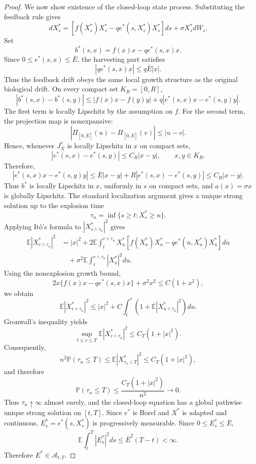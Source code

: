 \documentclass[11pt]{article}
\begin{document}
\begin{proof}
		We now show existence of the closed-loop state process. Substituting the feedback rule gives
		\[
		dX_s^*
		=
		\left[
		f(X_s^*)X_s^*
		-
		qe^*(s,X_s^*)X_s^*
		\right]ds
		+
		\sigma X_s^*dW_s.
		\]
		Set
		\[
		b^*(s,x)
		=
		f(x)x-qe^*(s,x)x.
		\]
		Since $0\le e^*(s,x)\le\bar E$, the harvesting part satisfies
		\[
		|qe^*(s,x)x|
		\le q\bar E |x|.
		\]
		Thus the feedback drift obeys the same local growth structure as the original biological drift. On every compact set $K_R=[0,R]$,
		\[
		|b^*(s,x)-b^*(s,y)|
		\le
		|f(x)x-f(y)y|
		+
		q|e^*(s,x)x-e^*(s,y)y|.
		\]
		The first term is locally Lipschitz by the assumption on $f$. For the second term, the projection map is nonexpansive:
		\[
		|\Pi_{[0,\bar E]}(u)-\Pi_{[0,\bar E]}(v)|
		\le |u-v|.
		\]
		Hence, whenever $J_X^*$ is locally Lipschitz in $x$ on compact sets,
		\[
		|e^*(s,x)-e^*(s,y)|
		\le
		C_R|x-y|,
		\qquad x,y\in K_R.
		\]
		Therefore,
		\[
		|e^*(s,x)x-e^*(s,y)y|
		\le
		\bar E|x-y|+R|e^*(s,x)-e^*(s,y)|
		\le
		C_R|x-y|.
		\]
		Thus $b^*$ is locally Lipschitz in $x$, uniformly in $s$ on compact sets, and $a(x)=\sigma x$ is globally Lipschitz. The standard localization argument gives a unique strong solution up to the explosion time
		\[
		\tau_n=\inf\{s\ge t:X_s^*\ge n\}.
		\]
		Applying It\^o's formula to $|X_{s\wedge\tau_n}^*|^2$ gives
		\[
		\begin{aligned}
			\mathbb{E}|X_{r\wedge\tau_n}^*|^2
			&=
			|x|^2
			+
			2\mathbb{E}\int_t^{r\wedge\tau_n}
			X_u^*
			\left[
			f(X_u^*)X_u^*
			-
			qe^*(u,X_u^*)X_u^*
			\right]du  \\
			&\quad
			+
			\sigma^2
			\mathbb{E}\int_t^{r\wedge\tau_n}
			|X_u^*|^2du .
		\end{aligned}
		\]
		Using the nonexplosion growth bound,
		\[
		2x\{f(x)x-qe^*(s,x)x\}+\sigma^2x^2
		\le
		C(1+x^2),
		\]
		we obtain
		\[
		\mathbb{E}|X_{r\wedge\tau_n}^*|^2
		\le
		|x|^2
		+
		C\int_t^r
		\left(
		1+
		\mathbb{E}|X_{u\wedge\tau_n}^*|^2
		\right)du.
		\]
		Gronwall's inequality yields
		\[
		\sup_{t\le r\le T}
		\mathbb{E}|X_{r\wedge\tau_n}^*|^2
		\le
		C_T(1+|x|^2).
		\]
		Consequently,
		\[
		n^2\mathbb{P}(\tau_n\le T)
		\le
		\mathbb{E}|X_{\tau_n\wedge T}^*|^2
		\le
		C_T(1+|x|^2),
		\]
		and therefore
		\[
		\mathbb{P}(\tau_n\le T)\le \frac{C_T(1+|x|^2)}{n^2}\to0.
		\]
		Thus $\tau_n\uparrow\infty$ almost surely, and the closed-loop equation has a global pathwise unique strong solution on $[t,T]$. Since $e^*$ is Borel and $X^*$ is adapted and continuous, $E_s^*=e^*(s,X_s^*)$ is progressively measurable. Since $0\le E_s^*\le\bar E$,
		\[
		\mathbb{E}\int_t^T |E_s^*|^2ds
		\le
		\bar E^2(T-t)<\infty.
		\]
		Therefore $E^*\in\mathcal{A}_{t,T}$.
		

\end{proof}
\end{document}
